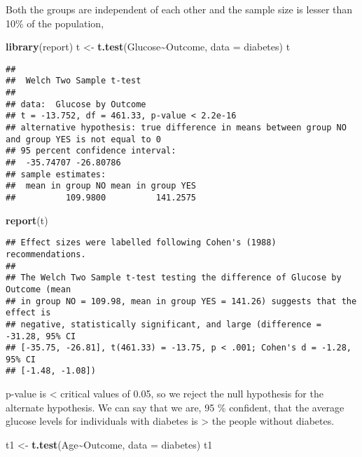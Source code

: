 \documentclass[
]{article}
\newenvironment{Shaded}{\begin{snugshade}}{\end{snugshade}}
\newcommand{\AttributeTok}[1]{\textcolor[rgb]{0.13,0.29,0.53}{#1}}
\newcommand{\FunctionTok}[1]{\textcolor[rgb]{0.13,0.29,0.53}{\textbf{#1}}}
\newcommand{\NormalTok}[1]{#1}
\newcommand{\OtherTok}[1]{\textcolor[rgb]{0.56,0.35,0.01}{#1}}
\newcommand{\SpecialCharTok}[1]{\textcolor[rgb]{0.81,0.36,0.00}{\textbf{#1}}}
\begin{document}
Both the groups are independent of each other and the sample size is
lesser than 10\% of the population,

\begin{Shaded}
\begin{Highlighting}[]
\FunctionTok{library}\NormalTok{(report)}
\NormalTok{t }\OtherTok{\textless{}{-}} \FunctionTok{t.test}\NormalTok{(Glucose}\SpecialCharTok{\textasciitilde{}}\NormalTok{Outcome, }\AttributeTok{data =}\NormalTok{ diabetes) }
\NormalTok{t}
\end{Highlighting}
\end{Shaded}

\begin{verbatim}
## 
##  Welch Two Sample t-test
## 
## data:  Glucose by Outcome
## t = -13.752, df = 461.33, p-value < 2.2e-16
## alternative hypothesis: true difference in means between group NO and group YES is not equal to 0
## 95 percent confidence interval:
##  -35.74707 -26.80786
## sample estimates:
##  mean in group NO mean in group YES 
##          109.9800          141.2575
\end{verbatim}

\begin{Shaded}
\begin{Highlighting}[]
\FunctionTok{report}\NormalTok{(t)}
\end{Highlighting}
\end{Shaded}

\begin{verbatim}
## Effect sizes were labelled following Cohen's (1988) recommendations.
## 
## The Welch Two Sample t-test testing the difference of Glucose by Outcome (mean
## in group NO = 109.98, mean in group YES = 141.26) suggests that the effect is
## negative, statistically significant, and large (difference = -31.28, 95% CI
## [-35.75, -26.81], t(461.33) = -13.75, p < .001; Cohen's d = -1.28, 95% CI
## [-1.48, -1.08])
\end{verbatim}

p-value is \textless{} critical values of 0.05, so we reject the null
hypothesis for the alternate hypothesis. We can say that we are, 95 \%
confident, that the average glucose levels for individuals with diabetes
is \textgreater{} the people without diabetes.

\begin{Shaded}
\begin{Highlighting}[]
\NormalTok{t1 }\OtherTok{\textless{}{-}} \FunctionTok{t.test}\NormalTok{(Age}\SpecialCharTok{\textasciitilde{}}\NormalTok{Outcome, }\AttributeTok{data =}\NormalTok{ diabetes)}
\NormalTok{t1}
\end{Highlighting}
\end{Shaded}
\end{document}
